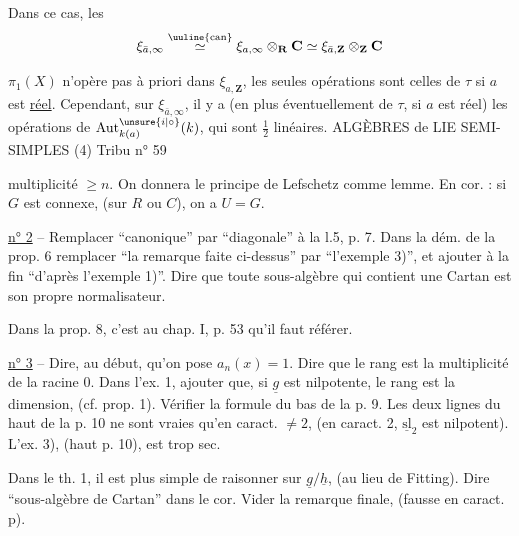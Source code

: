 Dans ce cas, les  
\[
\xi_{\bar a,\infty}\overset{\text{\uuline{can}}}{\simeq}\xi_{a,\infty}\otimes_{\mathbf R}\mathbf C
\simeq\xi_{\bar a,\mathbf Z}\otimes_{\mathbf Z}\mathbf C
\]

$\pi_1(X)$ n'opère pas à priori dans $\xi_{a,\mathbf Z}$, les seules opérations sont celles de $\tau$ si $a$ est \uline{réel}. Cependant, sur $\xi_{\bar a,\infty}$, il y a (en plus éventuellement de $\tau$, si $a$ est réel) les opérations de $\operatorname{Aut}_{k(a)}^{\unsure{i|\circ}}(k)$, qui sont $\frac12$ linéaires.
ALGÈBRES de LIE SEMI-SIMPLES (4) \hfill Tribu n° 59

multiplicité $\geq n$. On donnera le principe de Lefschetz comme lemme. En cor. : si $G$ est connexe, (sur $R$ ou $C$), on a $U=G$.

\uline{n° 2} -- Remplacer ``canonique'' par ``diagonale'' à la l.5, p. 7. Dans la dém. de la prop. 6 remplacer ``la remarque faite ci-dessus'' par ``l'exemple 3)'', et ajouter à la fin ``d'après l'exemple 1)''. Dire que toute sous-algèbre qui contient une Cartan est son propre normalisateur.

Dans la prop. 8, c'est au chap. I, p. 53 qu'il faut référer.

\uline{n° 3} -- Dire, au début, qu'on pose $a_n(x)=1$. Dire que le rang est la multiplicité de la racine 0. Dans l'ex. 1, ajouter que, si $\underline g$ est nilpotente, le rang est la dimension, (cf. prop. 1). Vérifier la formule du bas de la p. 9. Les deux lignes du haut de la p. 10 ne sont vraies qu'en caract. $\ne 2$, (en caract. 2, $\underline{\mathrm{sl}}_2$ est nilpotent). L'ex. 3), (haut p. 10), est trop sec.

Dans le th. 1, il est plus simple de raisonner sur $\underline g/\underline h$, (au lieu de Fitting). Dire ``sous-algèbre de Cartan'' dans le cor. Vider la remarque finale, (fausse en caract. p).

